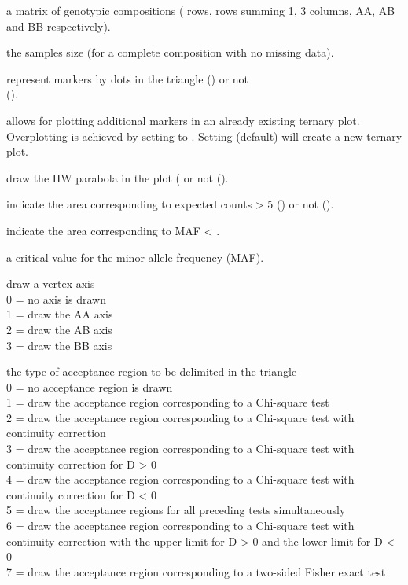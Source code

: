 \documentclass[a4paper]{article}
\begin{document}
\begin{Arguments}
\begin{ldescription}
\item[\code{X}] a matrix of  genotypic compositions ( rows, rows summing 1, 3 columns, AA, AB and BB respectively).
\item[\code{n}] the samples size (for a complete composition with no missing data). 
\item[\code{addmarkers}] represent markers by dots in the triangle () or not \\ 
(). 
\item[\code{newframe}] allows for plotting additional markers in an already existing ternary plot. Overplotting
is achieved by setting  to . Setting  (default) will 
create a new ternary plot. 
\item[\code{hwcurve}] draw the HW parabola in the plot ( or not (). 
\item[\code{vbounds}] indicate the area corresponding to expected counts > 5 () or not 
().
\item[\code{mafbounds}] indicate the area corresponding to MAF < . 
\item[\code{mafvalue}] a critical value for the minor allele frequency (MAF).
\item[\code{axis}] draw a vertex axis \\
0 = no axis is drawn \\
1 = draw the AA axis \\
2 = draw the AB axis \\
3 = draw the BB axis \\
\item[\code{region}] the type of acceptance region to be delimited in the triangle \\ 
0 = no acceptance region is drawn \\
1 = draw the acceptance region corresponding to a Chi-square test \\ 
2 = draw the acceptance region corresponding to a Chi-square test with continuity correction \\
3 = draw the acceptance region corresponding to a Chi-square test with continuity correction for D > 0 \\
4 = draw the acceptance region corresponding to a Chi-square test with continuity correction for D < 0 \\ 
5 = draw the acceptance regions for all preceding tests simultaneously \\ 
6 = draw the acceptance region corresponding to a Chi-square test with continuity correction with the upper
limit for D > 0 and the lower limit for D < 0 \\
7 = draw the acceptance region corresponding to a two-sided Fisher exact test \\


\end{ldescription}
\end{Arguments}
\end{document}
